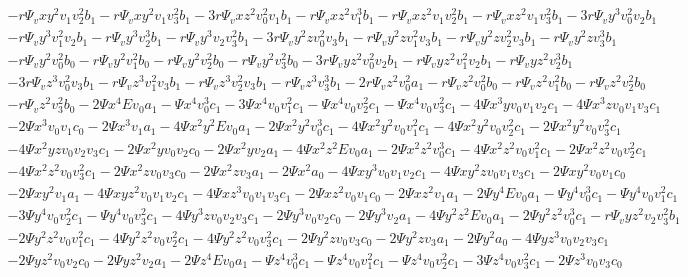 \documentclass{beamer}
\begin{document}
\begin{frame}
\[\begin{array}{l}
-r \Psi_v x y^2 v_1 v_2^2 b_1
-r \Psi_v x y^2 v_1 v_3^2 b_1-3 r \Psi_v x z^2 v_0^2 v_1 b_1-r \Psi_v x z^2 v_1^3 b_1-r \Psi_v x z^2 v_1 v_2^2 b_1-r \Psi_v x z^2 v_1 v_3^2 b_1
-3 r \Psi_v y^3 v_0^2 v_2 b_1 \\
-r \Psi_v y^3 v_1^2 v_2 b_1-r \Psi_v y^3 v_2^3 b_1-r \Psi_v y^3 v_2 v_3^2 b_1-3 r \Psi_v y^2 z v_0^2 v_3 b_1-r \Psi_v y^2 z v_1^2 v_3 b_1-r \Psi_v y^2 z v_2^2 v_3 b_1-r \Psi_v y^2 z v_3^3 b_1 \\
-r \Psi_v y^2 v_0^2 b_0-r \Psi_v y^2 v_1^2 b_0-r \Psi_v y^2 v_2^2 b_0-r \Psi_v y^2 v_3^2 b_0-3 r \Psi_v y z^2 v_0^2 v_2 b_1-r \Psi_v y z^2 v_1^2 v_2 b_1-r \Psi_v y z^2 v_2^3 b_1
\\
-3 r \Psi_v z^3 v_0^2 v_3 b_1-r \Psi_v z^3 v_1^2 v_3 b_1-r \Psi_v z^3 v_2^2 v_3 b_1-r \Psi_v z^3 v_3^3 b_1-2 r \Psi_v z^2 v_0^2 a_1-r \Psi_v z^2 v_0^2 b_0-r \Psi_v z^2 v_1^2 b_0-r \Psi_v z^2 v_2^2 b_0 \\
-r \Psi_v z^2 v_3^2 b_0-2 \Psi x^4 E v_0 a_1-\Psi x^4 v_0^3 c_1-3 \Psi x^4 v_0 v_1^2 c_1-\Psi x^4 v_0 v_2^2 c_1-\Psi x^4 v_0 v_3^2 c_1-4 \Psi x^3 y v_0 v_1 v_2 c_1-4 \Psi x^3 z v_0 v_1 v_3 c_1 \\
-2 \Psi x^3 v_0 v_1 c_0-2 \Psi x^3 v_1 a_1-4 \Psi x^2 y^2 E v_0 a_1-2 \Psi x^2 y^2 v_0^3 c_1-4 \Psi x^2 y^2 v_0 v_1^2 c_1-4 \Psi x^2 y^2 v_0 v_2^2 c_1
-2 \Psi x^2 y^2 v_0 v_3^2 c_1
\\
-4 \Psi x^2 y z v_0 v_2 v_3 c_1-2 \Psi x^2 y v_0 v_2 c_0-2 \Psi x^2 y v_2 a_1-4 \Psi x^2 z^2 E v_0 a_1-2 \Psi x^2 z^2 v_0^3 c_1
-4 \Psi x^2 z^2 v_0 v_1^2 c_1-2 \Psi x^2 z^2 v_0 v_2^2 c_1
\\
-4 \Psi x^2 z^2 v_0 v_3^2 c_1
-2 \Psi x^2 z v_0 v_3 c_0-2 \Psi x^2 z v_3 a_1-2 \Psi x^2 a_0-4 \Psi x y^3 v_0 v_1 v_2 c_1-4 \Psi x y^2 z v_0 v_1 v_3 c_1-2 \Psi x y^2 v_0 v_1 c_0
\\
-2 \Psi x y^2 v_1 a_1-4 \Psi x y z^2 v_0 v_1 v_2 c_1-4 \Psi x z^3 v_0 v_1 v_3 c_1-2 \Psi x z^2 v_0 v_1 c_0-2 \Psi x z^2 v_1 a_1-2 \Psi y^4 E v_0 a_1-\Psi y^4 v_0^3 c_1
-\Psi y^4 v_0 v_1^2 c_1
\\
-3 \Psi y^4 v_0 v_2^2 c_1-\Psi y^4 v_0 v_3^2 c_1-4 \Psi y^3 z v_0 v_2 v_3 c_1-2 \Psi y^3 v_0 v_2 c_0-2 \Psi y^3 v_2 a_1-4 \Psi y^2 z^2 E v_0 a_1-2 \Psi y^2 z^2 v_0^3 c_1
-r \Psi_v y z^2 v_2 v_3^2 b_1 \\
-2 \Psi y^2 z^2 v_0 v_1^2 c_1-4 \Psi y^2 z^2 v_0 v_2^2 c_1-4 \Psi y^2 z^2 v_0 v_3^2 c_1-2 \Psi y^2 z v_0 v_3 c_0-2 \Psi y^2 z v_3 a_1-2 \Psi y^2 a_0-4 \Psi y z^3 v_0 v_2 v_3 c_1
\\
-2 \Psi y z^2 v_0 v_2 c_0-2 \Psi y z^2 v_2 a_1-2 \Psi z^4 E v_0 a_1-\Psi z^4 v_0^3 c_1-\Psi z^4 v_0 v_1^2 c_1-\Psi z^4 v_0 v_2^2 c_1-3 \Psi z^4 v_0 v_3^2 c_1-2 \Psi z^3 v_0 v_3 c_0

\end{array}\]
\end{frame}
\end{document}
